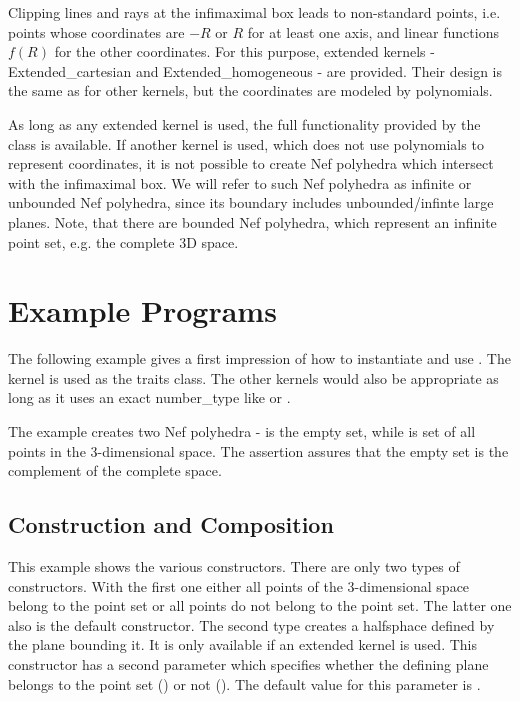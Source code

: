Clipping lines and rays at the infimaximal box leads to non-standard points,
i.e. points whose coordinates are $-R$ or $R$ for at least one axis, and
linear functions $f(R)$ for the other coordinates. For this purpose, extended
kernels - Extended_cartesian and Extended_homogeneous - are provided. Their
design is the same as for other \cgal kernels, but the coordinates are
modeled by polynomials.

As long as any extended kernel is used, the full functionality provided 
by the class  is available. If another kernel is
used, which does not use polynomials to represent coordinates, it is not
possible to create Nef polyhedra which intersect with the infimaximal box.
We will refer to such Nef polyhedra as infinite or unbounded Nef polyhedra, 
since its boundary includes unbounded/infinte large planes. Note, that
there are bounded Nef polyhedra, which represent an infinite
point set, e.g. the complete 3D space.

\section{Example Programs}

The following example gives a first impression of how to instantiate and use
. The \cgal kernel  is used as the traits
class. The other \cgal kernels would also be appropriate as long as it uses an
exact number_type like  or . 

The example creates two Nef polyhedra -  is the empty set, while 
 is set of all points in the 3-dimensional space. The assertion assures
that the empty set is the complement of the complete space.


\subsection{Construction and Composition}

This example shows the various constructors. There are only two
types of constructors. With the first one either all points of the 3-dimensional
space belong to the point set or all points do not belong to the point set. The
latter one also is the default constructor. The second type creates a halfsphace
defined by the plane bounding it. It is only available if an extended kernel is
used. This constructor has a second parameter which
specifies whether the defining plane belongs to the point set 
() or not (). The 
default value for this parameter is .


